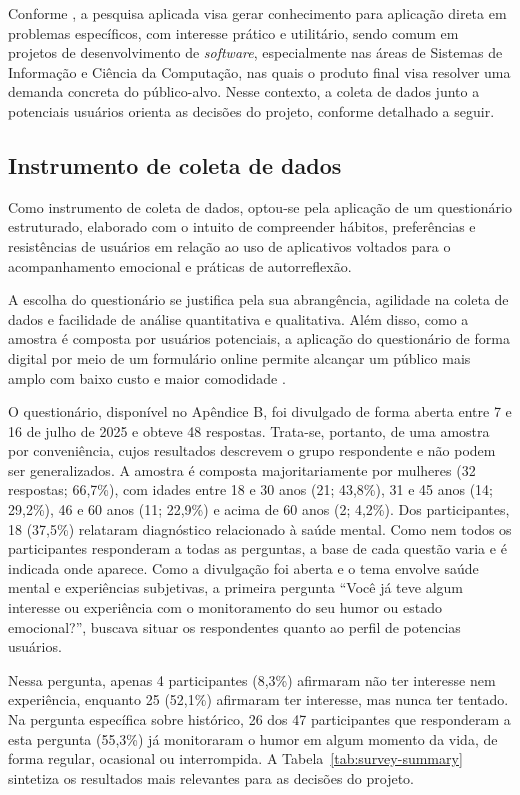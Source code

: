Conforme \cite{Gerhardt:09}, a pesquisa aplicada visa gerar conhecimento para
aplicação direta em problemas específicos, com interesse prático e utilitário,
sendo comum em projetos de desenvolvimento de \textit{software}, especialmente
nas áreas de Sistemas de Informação e Ciência da Computação, nas quais o
produto final visa resolver uma demanda concreta do público-alvo. Nesse
contexto, a coleta de dados junto a potenciais usuários orienta as decisões do
projeto, conforme detalhado a seguir.

\subsection{Instrumento de coleta de dados}

Como instrumento de coleta de dados, optou-se pela aplicação de um questionário
estruturado, elaborado com o intuito de compreender hábitos, preferências e
resistências de usuários em relação ao uso de aplicativos voltados para o
acompanhamento emocional e práticas de autorreflexão.

A escolha do questionário se justifica pela sua abrangência, agilidade na
coleta de dados e facilidade de análise quantitativa e qualitativa. Além disso,
como a amostra é composta por usuários potenciais, a aplicação do questionário
de forma digital por meio de um formulário online permite alcançar um público
mais amplo com baixo custo e maior comodidade \cite{EvansAndMathur:2005}.

O questionário, disponível no Apêndice B, foi divulgado de forma aberta entre 7
e 16 de julho de 2025 e obteve 48 respostas. Trata-se, portanto, de uma amostra
por conveniência, cujos resultados descrevem o grupo respondente e não podem
ser generalizados. A amostra é composta majoritariamente por mulheres (32
respostas; 66,7\%), com idades entre 18 e 30 anos (21; 43,8\%), 31 e 45 anos
(14; 29,2\%), 46 e 60 anos (11; 22,9\%) e acima de 60 anos (2; 4,2\%). Dos
participantes, 18 (37,5\%) relataram diagnóstico relacionado à saúde mental.
Como nem todos os participantes responderam a todas as perguntas, a base de
cada questão varia e é indicada onde aparece.
Como a divulgação foi aberta e o tema envolve saúde mental e experiências
subjetivas, a primeira pergunta ``Você já teve algum interesse ou experiência
com o monitoramento do seu humor ou estado emocional?'', buscava situar os
respondentes quanto ao perfil de potencias usuários.

Nessa pergunta, apenas 4 participantes (8,3\%) afirmaram não ter interesse nem
experiência, enquanto 25 (52,1\%) afirmaram ter interesse, mas nunca ter
tentado. Na pergunta específica sobre histórico, 26 dos 47 participantes que
responderam a esta pergunta (55,3\%) já monitoraram o humor em algum momento
da vida, de forma regular, ocasional ou interrompida. A
Tabela~\ref{tab:survey-summary} sintetiza os
resultados mais relevantes para as decisões do projeto.

